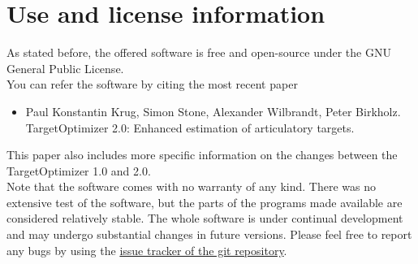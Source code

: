 \section{Use and license information}
As stated before, the offered software is free and open-source under the GNU General Public License.\\ 
You can refer the software by citing the most recent paper

\begin{itemize}
\item[\ding{71}]
Paul Konstantin Krug, Simon Stone, Alexander Wilbrandt, Peter Birkholz. TargetOptimizer 2.0: Enhanced estimation of articulatory targets. \cite{TO2}
\end{itemize}

This paper also includes more specific information on the changes between the TargetOptimizer 1.0 and 2.0.\\
Note that the software comes with no warranty of any kind. There was no extensive test of the software, but the parts of the programs made available are considered relatively stable. The whole software is under continual development and may undergo substantial changes in future versions. Please feel free to report any bugs by using the  \href{https://github.com/TUD-STKS/TargetOptimizer/issues/new}{issue tracker of the git repository}.